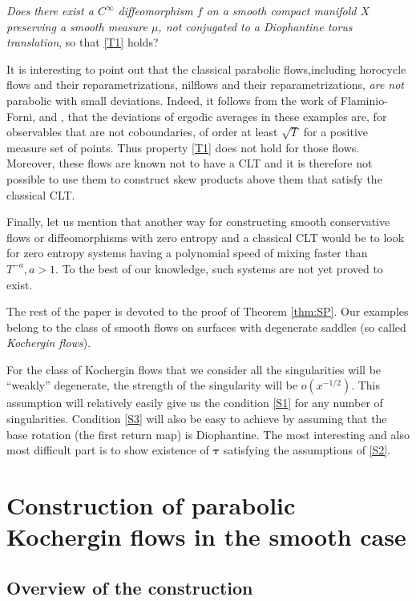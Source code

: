 \documentclass[JEP,XML,SOM,Unicode,NoFloatCountersInSection]{cedram}
\newcommand\btau{{\boldsymbol{\tau}}}
\theoremstyle{definition}
\theoremstyle{plain}
\begin{document}
\emph{Does there exist a $C^\infty$ diffeomorphism $f$ on a smooth compact manifold $X$ preserving a smooth measure $\mu$, not conjugated to a Diophantine torus translation},
so that \eqref{T1} holds?

It is interesting to point out that the classical parabolic flows,including horocycle flows and their reparametrizations, nilflows and their reparametrizations, \emph{are not} parabolic with small deviations. Indeed, it follows from the work of Flaminio-Forni, \cite{Fla-Fo} and \cite{Fla-Fo2}, that the deviations of ergodic averages in these examples are, for observables that are not coboundaries, of order at least $\sqrt{T}$ for a positive measure set of points.
Thus property \eqref{T1} does not hold for those flows.
Moreover, these flows are known not to have a CLT and it is therefore not possible to use them to construct skew products above them that satisfy the classical CLT.

{Finally, let us mention that another way for constructing smooth conservative flows or diffeomorphisms with zero entropy and a classical CLT would be to look for zero entropy systems having a polynomial speed of mixing faster than $T^{-a}, a>1$. To the best of our knowledge, such systems are not yet proved to exist.}

The rest of the paper is devoted to the proof of Theorem \ref{thm:SP}. Our examples
belong to the class of smooth flows on surfaces with degenerate saddles (so called \emph{Kochergin flows}).

For the class of Kochergin flows that we consider all the singularities will be ``weakly'' degenerate, \ie the strength of the singularity will be $o(x^{-1/2})$. This assumption will relatively easily give us the condition \eqref{S1} for any number of singularities. Condition \eqref{S3} will also be easy to achieve by assuming that the base rotation (the first return map) is Diophantine. The most interesting and also most difficult part is to show existence of $\btau$ satisfying the assumptions of \eqref{S2}.

\section{Construction of parabolic Kochergin flows in the smooth case} \label{sec.koc}

\subsection{Overview of the construction}
\label{SSOverview}
\end{document}
